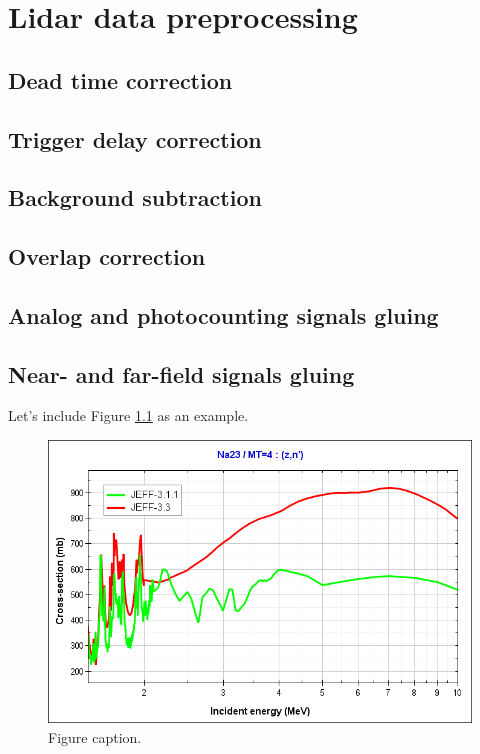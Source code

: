 \chapter{Lidar data preprocessing}
\label{sect:devs02_chapter1}

\section{Dead time correction}
\label{sect::devs02_chapter1_deadtime}

\section{Trigger delay correction}
\label{sect::devs02_chapter1_triggerdelay}

\section{Background subtraction}
\label{sect::devs02_chapter1_triggerdelay}

\section{Overlap correction}
\label{sect::devs02_chapter1_overlap}

\section{Analog and photocounting signals gluing}
\label{sect::devs02_chapter1_gluing_channels}

\section{Near- and far-field signals gluing}
\label{sect::devs02_chapter1_gluing_systems}

Let's include Figure \ref{fig::figure01} as an example.

\begin{figure}[h!]
	\begin{center}
		\includegraphics[width=1\textwidth]{TeX_files/Methodology/Figures/na23-mt4-XS-jeff33-jeff311.png}
		\caption{Figure caption.}
		\label{fig::figure01}
	\end{center}
\end{figure}